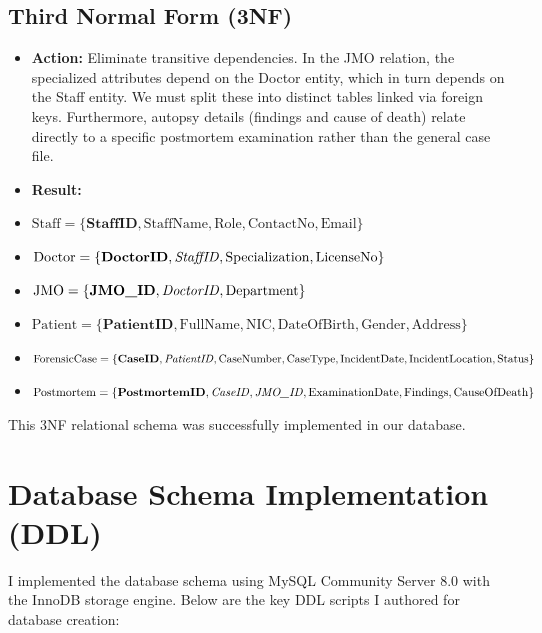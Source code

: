 \documentclass[12pt,a4paper]{article}
\begin{document}
\subsection{Third Normal Form (3NF)}
\begin{itemize}
    \item \textbf{Action:} Eliminate transitive dependencies. In the JMO relation, the specialized attributes depend on the Doctor entity, which in turn depends on the Staff entity. We must split these into distinct tables linked via foreign keys. Furthermore, autopsy details (findings and cause of death) relate directly to a specific postmortem examination rather than the general case file.
    \item \textbf{Result:}
\end{itemize}
\begin{itemize}
    \item $\text{Staff} = \{\textbf{StaffID}, \text{StaffName}, \text{Role}, \text{ContactNo}, \text{Email}\}$
    \item $\text{Doctor} = \{\textbf{DoctorID}, \text{\textit{StaffID}}, \text{Specialization}, \text{LicenseNo}\}$
    \item $\text{JMO} = \{\textbf{JMO\_ID}, \text{\textit{DoctorID}}, \text{Department}\}$
    \item $\text{Patient} = \{\textbf{PatientID}, \text{FullName}, \text{NIC}, \text{DateOfBirth}, \text{Gender}, \text{Address}\}$
    \item $\text{ForensicCase} = \{\textbf{CaseID}, \text{\textit{PatientID}}, \text{CaseNumber}, \text{CaseType}, \text{IncidentDate}, \text{IncidentLocation}, \text{Status}\}$
    \item $\text{Postmortem} = \{\textbf{PostmortemID}, \text{\textit{CaseID}}, \text{\textit{JMO\_ID}}, \text{ExaminationDate}, \text{Findings}, \text{CauseOfDeath}\}$
\end{itemize}
This 3NF relational schema was successfully implemented in our database.

\section{Database Schema Implementation (DDL)}
I implemented the database schema using MySQL Community Server 8.0 with the InnoDB storage engine. Below are the key DDL scripts I authored for database creation:
\end{document}
